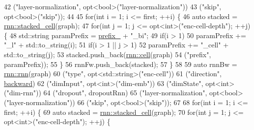 \begin{DoxyCode}
42                  (\textcolor{stringliteral}{"layer-normalization"}, opt<bool>(\textcolor{stringliteral}{"layer-normalization"}))
43                  (\textcolor{stringliteral}{"skip"}, opt<bool>(\textcolor{stringliteral}{"skip"}));
44 
45     \textcolor{keywordflow}{for}(\textcolor{keywordtype}{int} i = 1; i <= first; ++i) \{
46       \textcolor{keyword}{auto} stacked = \hyperlink{namespacemarian_1_1rnn_a55385034d5ad19187245bb2b564cb7eb}{rnn::stacked\_cell}(graph);
47       \textcolor{keywordflow}{for}(\textcolor{keywordtype}{int} j = 1; j <= opt<int>(\textcolor{stringliteral}{"enc-cell-depth"}); ++j) \{
48         std::string paramPrefix = \hyperlink{classmarian_1_1EncoderBase_abbd764c19ebaae1d6e4ffec0c9930fba}{prefix\_} + \textcolor{stringliteral}{"\_bi"};
49         \textcolor{keywordflow}{if}(i > 1)
50           paramPrefix += \textcolor{stringliteral}{"\_l"} + std::to\_string(i);
51         \textcolor{keywordflow}{if}(i > 1 || j > 1)
52           paramPrefix += \textcolor{stringliteral}{"\_cell"} + std::to\_string(j);
53         stacked.push\_back(\hyperlink{namespacemarian_1_1rnn_af723e51535e0b11de5b28fe19627a3fb}{rnn::cell}(graph)
54                           (\textcolor{stringliteral}{"prefix"}, paramPrefix));
55       \}
56       rnnFw.push\_back(stacked);
57     \}
58 
59     \textcolor{keyword}{auto} rnnBw = \hyperlink{namespacemarian_1_1rnn_aff1b115e415945b445f8d4a2068ec3e8}{rnn::rnn}(graph)
60                  (\textcolor{stringliteral}{"type"}, opt<std::string>(\textcolor{stringliteral}{"enc-cell"}))
61                  (\textcolor{stringliteral}{"direction"}, \hyperlink{namespacemarian_1_1rnn_acba2ce4446fe9654f1fd2c69793e34caa195fe59b6f103787a914aead0f3db502}{backward})
62                  (\textcolor{stringliteral}{"dimInput"}, opt<int>(\textcolor{stringliteral}{"dim-emb"}))
63                  (\textcolor{stringliteral}{"dimState"}, opt<int>(\textcolor{stringliteral}{"dim-rnn"}))
64                  (\textcolor{stringliteral}{"dropout"}, dropoutRnn)
65                  (\textcolor{stringliteral}{"layer-normalization"}, opt<bool>(\textcolor{stringliteral}{"layer-normalization"}))
66                  (\textcolor{stringliteral}{"skip"}, opt<bool>(\textcolor{stringliteral}{"skip"}));
67 
68     \textcolor{keywordflow}{for}(\textcolor{keywordtype}{int} i = 1; i <= first; ++i) \{
69       \textcolor{keyword}{auto} stacked = \hyperlink{namespacemarian_1_1rnn_a55385034d5ad19187245bb2b564cb7eb}{rnn::stacked\_cell}(graph);
70       \textcolor{keywordflow}{for}(\textcolor{keywordtype}{int} j = 1; j <= opt<int>(\textcolor{stringliteral}{"enc-cell-depth"}); ++j) \{

\end{DoxyCode}

